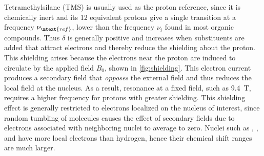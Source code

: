 \documentclass[nobib,nofonts,nols,nohyper,draft]{tufte-handout}
\begin{document}
Tetramethylsilane (TMS) is usually used as the proton reference, since it is chemically inert and its 12 equivalent protons give a single transition at a frequency \( \nu_\mtext{ref} \), lower than the frequency \( \nu_i \) found in most organic compounds. 
Thus \( \delta \) is generally positive and increases when substituents are added that attract electrons and thereby reduce the shielding about the proton. 
This shielding arises because the electrons near the proton are induced to circulate by the applied field \( B_0 \), shown in \cref{fig:shielding}. 
This electron current produces a secondary field that \emph{opposes} the external field and thus reduces the local field at the nucleus. 
As a result, resonance at a fixed field, such as \SI{9.4}{\tesla}, requires a higher frequency for protons with greater shielding. 
This shielding effect is generally restricted to electrons localized on the nucleus of interest, since random tumbling of molecules causes the effect of secondary fields due to electrons associated with neighboring nuclei to average to zero. 
Nuclei such as , , and  have more local electrons than hydrogen, hence their chemical shift ranges are much larger. 
\end{document}
